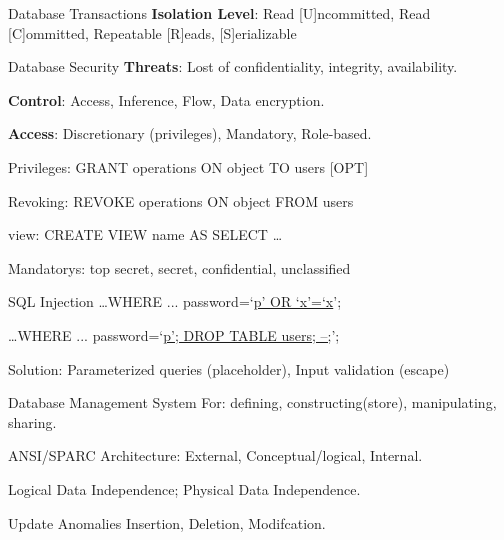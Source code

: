 \documentclass[a4paper]{article}
\begin{document}
\begin{multicols}{3}
\begin{cheatsheetblock}{Database Transactions}
    \textbf{Isolation Level}: Read [U]ncommitted, Read [C]ommitted, Repeatable [R]eads, [S]erializable
\end{cheatsheetblock}

\begin{cheatsheetblock}{Database Security}
    \textbf{Threats}: Lost of confidentiality, integrity, availability.

    \textbf{Control}: Access, Inference, Flow, Data encryption.

    \textbf{Access}: Discretionary (privileges), Mandatory, Role-based.

    Privileges: \hfill GRANT operations ON object TO users [OPT]
    
    Revoking: \hfill REVOKE operations ON object FROM users

    view: \hfill CREATE VIEW name AS SELECT \dots

    Mandatorys: top secret, secret, confidential, unclassified

\end{cheatsheetblock}

\begin{cheatsheetblock}{SQL Injection}
    \dots WHERE ... password=`\underline{p' OR `x'=`x}';

    \dots WHERE ... password=`\underline{p'; DROP TABLE users; --;}';

    Solution: Parameterized queries (placeholder), Input validation (escape)
\end{cheatsheetblock}

\begin{cheatsheetblock}{Database Management System}
    For: defining, constructing(store), manipulating, sharing.

    ANSI/SPARC Architecture: External, Conceptual/logical, Internal.

    Logical Data Independence; Physical Data Independence.
\end{cheatsheetblock}

\begin{cheatsheetblock}{Update Anomalies}
    Insertion, Deletion, Modifcation.
\end{cheatsheetblock}

\end{multicols}
\end{document}

